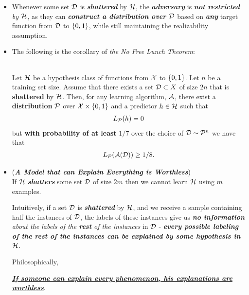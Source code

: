 \documentclass[11pt]{article}
\begin{document}
\begin{itemize}
\item \begin{remark}
Whenever some set ${\mathcal D}$ is \emph{\textbf{shattered}} by ${\mathcal H}$, the \emph{\textbf{adversary}} is \emph{\textbf{not restricted} by ${\mathcal H}$}, as they can \emph{\textbf{construct a distribution over ${\mathcal D}$}} based on \emph{\textbf{any}} target function from ${\mathcal D}$ to $\left\{0,1\right\}$, while still maintaining the realizability assumption. 
\end{remark}

\item The following is the corollary of \emph{the No Free Lunch Theorem}:
\begin{corollary} \citep{shalev2014understanding}\\
Let ${\mathcal H}$ be a hypothesis class of functions from ${\mathcal X}$ to $\left\{0,1\right\}$. Let $n$ be a training set size. Assume that there exists a set ${\mathcal D} \subset X$ of size $2n$ that is \textbf{shattered} by ${\mathcal H}$. Then, for any learning algorithm, ${\mathcal A}$, there exist a \textbf{distribution} ${\mathcal P}$ over ${\mathcal X} \times \left\{0,1\right\}$
and a predictor $h \in {\mathcal H}$ such that 
\begin{align*}
L_{{\mathcal P}}(h) = 0
\end{align*}
but \textbf{with probability of at least} $1/7$ over the choice of ${\mathcal D} \sim {\mathcal P}^n$ we have that 
\begin{align*}
L_{{\mathcal P}}({\mathcal A}({\mathcal D})) \ge 1/8.
\end{align*}
\end{corollary}

\item \begin{remark} (\emph{\textbf{A Model that can Explain Everything is Worthless}})\\
If ${\mathcal H}$ \emph{\textbf{shatters}} some set ${\mathcal D}$ of size $2m$ then we cannot learn ${\mathcal H}$ using $m$ examples. 

Intuitively, if a set ${\mathcal D}$ is \emph{\textbf{shattered}} by ${\mathcal H}$, and we receive a sample containing half the instances of ${\mathcal D}$, the labels of these instances give us \emph{\textbf{no information} about the labels of the \textbf{rest} of the instances} in ${\mathcal D}$ - \emph{\textbf{every possible labeling of the rest of the instances can be explained by some hypothesis in ${\mathcal H}$}}. 

Philosophically,

\underline{\emph{\textbf{If someone can explain every phenomenon, his explanations are worthless}}}.
\end{remark}


\end{itemize}
\end{document}
